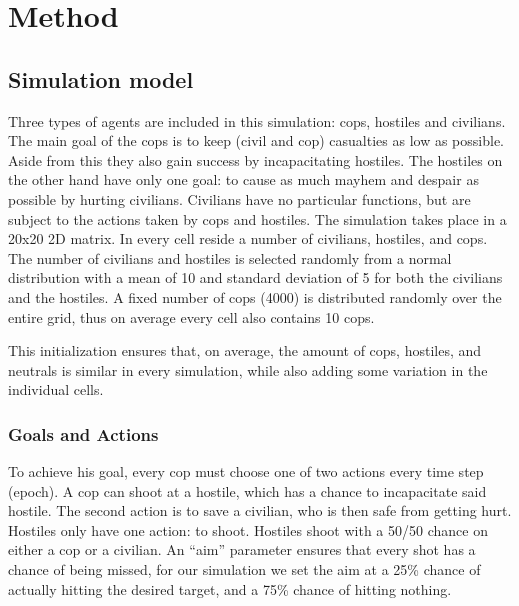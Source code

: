 \section{Method}
\subsection{Simulation model}
Three types of agents are included in this simulation: cops, hostiles and civilians.
The main goal of the cops is to keep (civil and cop) casualties as low as possible. Aside from this they also gain success by incapacitating hostiles.
The hostiles on the other hand have only one goal: to cause as much mayhem and despair as possible by hurting civilians.
Civilians have no particular functions, but are subject to the actions taken by cops and hostiles.
The simulation takes place in a 20x20 2D matrix.
In every cell reside a number of civilians, hostiles, and cops.
The number of civilians and hostiles is selected randomly from a normal distribution 
with a mean of 10 and standard deviation of 5 for both the civilians and the hostiles.
A fixed number of cops (4000) is distributed randomly over the entire grid,
thus on average every cell also contains 10 cops.

This initialization ensures that, on average, the amount of cops, hostiles, and neutrals is 
similar in every simulation, while also adding some variation in the individual cells.

\subsubsection{Goals and Actions}
To achieve his goal, every cop must choose one of two actions every time step (epoch).
A cop can shoot at a hostile, which has a chance to incapacitate said hostile.
The second action is to save a civilian, who is then safe from getting hurt.
Hostiles only have one action: to shoot.
Hostiles shoot with a 50/50 chance on either a cop or a civilian. 
An ``aim'' parameter ensures that every shot has a chance of being missed,
for our simulation we set the aim at a 25\% chance of actually hitting the desired target,
and a 75\% chance of hitting nothing.

